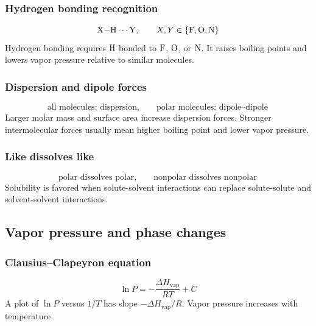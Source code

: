 \subsubsection{Hydrogen bonding recognition}
\begin{equation}
\label{eq:phase:hydrogen-bonding}
\mathrm{X{-}H\cdots Y}, \qquad X,Y\in\{\ce{F},\ce{O},\ce{N}\}
\end{equation}
Hydrogen bonding requires \(\ce{H}\) bonded to \(\ce{F}\), \(\ce{O}\), or \(\ce{N}\). It raises boiling points and lowers vapor pressure relative to similar molecules.

\subsubsection{Dispersion and dipole forces}
\begin{equation}
\label{eq:phase:force-recognition}
\text{all molecules: dispersion}, \qquad \text{polar molecules: dipole--dipole}
\end{equation}
Larger molar mass and surface area increase dispersion forces. Stronger intermolecular forces usually mean higher boiling point and lower vapor pressure.

\subsubsection{Like dissolves like}
\begin{equation}
\label{eq:phase:like-dissolves-like}
\text{polar dissolves polar}, \qquad \text{nonpolar dissolves nonpolar}
\end{equation}
Solubility is favored when solute-solvent interactions can replace solute-solute and solvent-solvent interactions.

\subsection{Vapor pressure and phase changes}

\subsubsection{Clausius--Clapeyron equation}
\begin{equation}
\label{eq:phase:clausius-clapeyron}
\ln P=-\frac{\Delta H_{\mathrm{vap}}}{RT}+C
\end{equation}
A plot of \(\ln P\) versus \(1/T\) has slope \(-\Delta H_{\mathrm{vap}}/R\). Vapor pressure increases with temperature.


